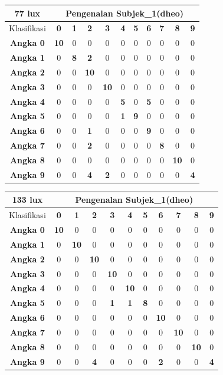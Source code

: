 \begin{tabular}{|c|c|c|c|c|c|c|c|c|c|c|}
	\hline 77 lux
	& \multicolumn{10}{|c|}{Pengenalan Subjek\_1(dheo)} \\
	\hline  Klasifikasi&\textbf{0} &\textbf{1} &\textbf{2} &\textbf{3} &\textbf{4}&\textbf{5} &\textbf{6}&\textbf{7}&\textbf{8}&\textbf{9}\\
	\hline \textbf{Angka 0} &\textbf{10} &0 &0 &0 &0 &0 &0 &0 &0 &0\\
	\hline \textbf{Angka 1} &0 &\textbf{8} &\textbf{2} &0 &0 &0 &0 &0 &0 &0\\
	\hline \textbf{Angka 2} &0 &0 &\textbf{10} &0 &0 &0 &0 &0 &0 &0\\
	\hline \textbf{Angka 3} &0 &0 &0 &\textbf{10} &0 &0 &0 &0 &0 &0\\
	\hline \textbf{Angka 4} &0 &0 &0 &0 &\textbf{5} &0 &\textbf{5} &0 &0 &0\\
	\hline \textbf{Angka 5} &0 &0 &0 &0 &\textbf{1} &\textbf{9} &0 &0 &0 &0\\
	\hline \textbf{Angka 6} &0 &0 &\textbf{1} &0 &0 &0 &\textbf{9} &0 &0 &0\\
	\hline \textbf{Angka 7} &0 &0 &\textbf{2} &0 &0 &0 &0 &\textbf{8} &0 &0\\
	\hline \textbf{Angka 8} &0 &0 &0 &0 &0 &0 &0 &0 &\textbf{10} &0 \\
	\hline \textbf{Angka 9} &0 &0 &\textbf{4} &\textbf{2} &0 &0 &0 &0 &0 &\textbf{4} \\
	\hline
\end{tabular}

\begin{tabular}{|c|c|c|c|c|c|c|c|c|c|c|}
	\hline 133 lux
	& \multicolumn{10}{|c|}{Pengenalan Subjek\_1(dheo)} \\
	\hline  Klasifikasi&\textbf{0} &\textbf{1} &\textbf{2} &\textbf{3} &\textbf{4}&\textbf{5} &\textbf{6}&\textbf{7}&\textbf{8}&\textbf{9}\\
	\hline \textbf{Angka 0} &\textbf{10} &0 &0 &0 &0 &0 &0 &0 &0 &0\\
	\hline \textbf{Angka 1} &0 &\textbf{10} &0 &0 &0 &0 &0 &0 &0 &0\\
	\hline \textbf{Angka 2} &0 &0 &\textbf{10} &0 &0 &0 &0 &0 &0 &0\\
	\hline \textbf{Angka 3} &0 &0 &0 &\textbf{10} &0 &0 &0 &0 &0 &0\\
	\hline \textbf{Angka 4} &0 &0 &0 &0 &\textbf{10} &0 &0 &0 &0 &0\\
	\hline \textbf{Angka 5} &0 &0 &0 &\textbf{1} &\textbf{1} &\textbf{8} &0 &0 &0 &0\\
	\hline \textbf{Angka 6} &0 &0 &0 &0 &0 &0 &\textbf{10} &0 &0 &0\\
	\hline \textbf{Angka 7} &0 &0 &0 &0 &0 &0 &0 &\textbf{10} &0 &0\\
	\hline \textbf{Angka 8} &0 &0 &0 &0 &0 &0 &0 &0 &\textbf{10} &0 \\
	\hline \textbf{Angka 9} &0 &0 &\textbf{4} &0 &0 &0 &\textbf{2} &0 &0 &\textbf{4} \\
	\hline
\end{tabular}

